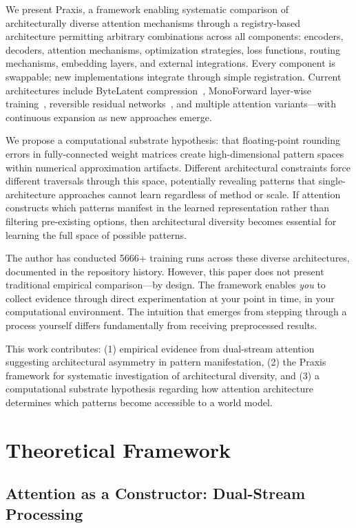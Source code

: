 \documentclass{article}
\begin{document}
We present Praxis, a framework enabling systematic comparison of architecturally diverse attention mechanisms through a registry-based architecture permitting arbitrary combinations across all components: encoders, decoders, attention mechanisms, optimization strategies, loss functions, routing mechanisms, embedding layers, and external integrations. Every component is swappable; new implementations integrate through simple registration. Current architectures include ByteLatent compression~\cite{pagnoni2024byte}, MonoForward layer-wise training~\cite{monoforward2025}, reversible residual networks~\cite{gomez2017reversible}, and multiple attention variants—with continuous expansion as new approaches emerge.

We propose a computational substrate hypothesis: that floating-point rounding errors in fully-connected weight matrices create high-dimensional pattern spaces within numerical approximation artifacts. Different architectural constraints force different traversals through this space, potentially revealing patterns that single-architecture approaches cannot learn regardless of method or scale. If attention constructs which patterns manifest in the learned representation rather than filtering pre-existing options, then architectural diversity becomes essential for learning the full space of possible patterns.

The author has conducted 5666+ training runs across these diverse architectures, documented in the repository history. However, this paper does not present traditional empirical comparison—by design. The framework enables \textit{you} to collect evidence through direct experimentation at your point in time, in your computational environment. The intuition that emerges from stepping through a process yourself differs fundamentally from receiving preprocessed results.

This work contributes: (1) empirical evidence from dual-stream attention suggesting architectural asymmetry in pattern manifestation, (2) the Praxis framework for systematic investigation of architectural diversity, and (3) a computational substrate hypothesis regarding how attention architecture determines which patterns become accessible to a world model.

\section{Theoretical Framework}

\subsection{Attention as a Constructor: Dual-Stream Processing}
\end{document}

